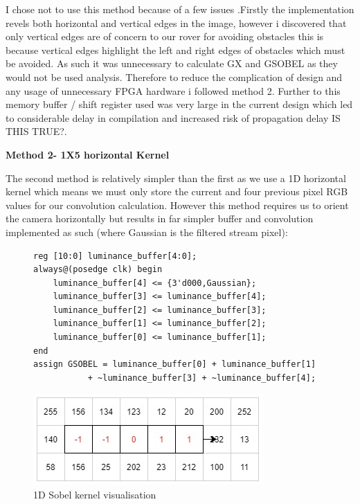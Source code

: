 \documentclass[10pt,twoside]{article}
\begin{document}
I chose not to use this method because of a few issues .Firstly the implementation revels both horizontal and vertical edges in the image, however i discovered that only vertical edges are of concern to our rover for avoiding obstacles this is because vertical edges highlight the left and right edges of obstacles which must be avoided. As such it was unnecessary to calculate GX and GSOBEL as they would not be used analysis. Therefore to reduce the complication of design and any usage of unnecessary FPGA hardware i followed method 2. Further to this memory buffer / shift register used was very large in the current design which led to considerable delay in compilation and increased risk of propagation delay IS THIS TRUE?. 

\textbf{Method 2- 1X5 horizontal Kernel}

The second method is relatively simpler than the first as we use  a 1D horizontal kernel which  means we must only store the current and four previous pixel RGB values for our convolution calculation. However this method requires us to orient the camera horizontally but results in far simpler buffer and convolution implemented as such (where Gaussian is the filtered stream pixel):

\begin{figure}[hbt]
\begin{minipage}{.56\textwidth}
\begin{verbatim}
reg [10:0] luminance_buffer[4:0];
always@(posedge clk) begin
    luminance_buffer[4] <= {3'd000,Gaussian}; 
	luminance_buffer[3] <= luminance_buffer[4]; 
	luminance_buffer[2] <= luminance_buffer[3]; 
	luminance_buffer[1] <= luminance_buffer[2]; 
	luminance_buffer[0] <= luminance_buffer[1];
end
assign GSOBEL = luminance_buffer[0] + luminance_buffer[1] 
           + ~luminance_buffer[3] + ~luminance_buffer[4]; 
\end{verbatim}
\end{minipage}
\begin{minipage}{.42\textwidth}
            \includegraphics[scale = 0.4]{Method2Matrix.jpg}
            \centering
            \caption{1D Sobel kernel visualisation}
            \label{fig:InitalDesign}
\end{minipage}
\end{figure}
\end{document}
